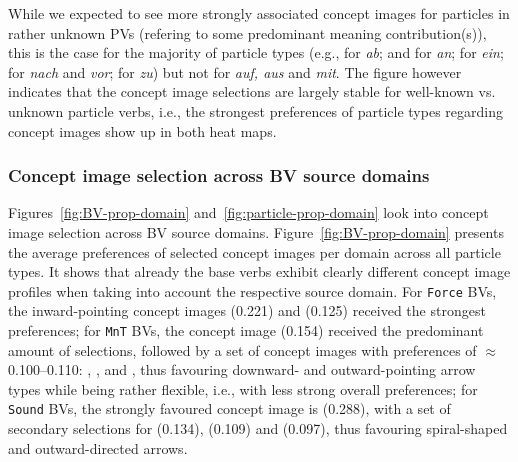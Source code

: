 \documentclass[output=paper]{langsci/langscibook}
\begin{document}
While we expected to see more strongly associated concept images for
particles in rather unknown PVs (refering to some predominant meaning
contribution(s)), this is the case for the majority of particle types
(e.g.,  for \textit{ab}; 
and  for \textit{an};  for
\textit{ein};  for \textit{nach} and \textit{vor};
 for \textit{zu}) but not for \textit{auf, aus} and
\textit{mit}. The figure however indicates that the concept image
selections are largely stable for well-known vs. unknown particle
verbs, i.e., the strongest preferences of particle types regarding
concept images show up in both heat maps.


\subsubsection{Concept image selection across BV source domains}

Figures~\ref{fig:BV-prop-domain} and~\ref{fig:particle-prop-domain}
look into concept image selection across BV source
domains. Figure~\ref{fig:BV-prop-domain} presents the average
preferences of selected concept images per domain across all particle
types. It shows that already the base verbs exhibit clearly different
concept image profiles when taking into account the respective source
domain. For \texttt{Force} BVs, the inward-pointing concept images
 (0.221) and  (0.125) received the
strongest preferences; for \texttt{MnT} BVs, the concept image
 (0.154) received the predominant amount of
selections, followed by a set of concept images with preferences of
$\approx$0.100--0.110: , ,
 and , thus favouring
downward- and outward-pointing arrow types while being rather
flexible, i.e., with less strong overall preferences; for
\texttt{Sound} BVs, the strongly favoured concept image is
 (0.288), with a set of secondary selections for
 (0.134),  (0.109) and
 (0.097), thus favouring spiral-shaped and
outward-directed arrows.
\end{document}
